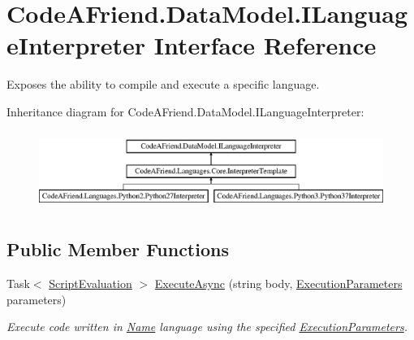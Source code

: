 \hypertarget{interface_code_a_friend_1_1_data_model_1_1_i_language_interpreter}{}\section{Code\+A\+Friend.\+Data\+Model.\+I\+Language\+Interpreter Interface Reference}
\label{interface_code_a_friend_1_1_data_model_1_1_i_language_interpreter}


Exposes the ability to compile and execute a specific language.  


Inheritance diagram for Code\+A\+Friend.\+Data\+Model.\+I\+Language\+Interpreter\+:\begin{figure}[H]
\begin{center}
\leavevmode
\includegraphics[height=2.560976cm]{interface_code_a_friend_1_1_data_model_1_1_i_language_interpreter}
\end{center}
\end{figure}
\subsection*{Public Member Functions}
\begin{DoxyCompactItemize}
\item 
Task$<$ \mbox{\hyperlink{class_code_a_friend_1_1_data_model_1_1_script_evaluation}{Script\+Evaluation}} $>$ \mbox{\hyperlink{interface_code_a_friend_1_1_data_model_1_1_i_language_interpreter_a3003897aaa13ee672b6157c584e46898}{Execute\+Async}} (string body, \mbox{\hyperlink{class_code_a_friend_1_1_data_model_1_1_execution_parameters}{Execution\+Parameters}} parameters)
\begin{DoxyCompactList}\small\item\em Execute code written in \mbox{\hyperlink{interface_code_a_friend_1_1_data_model_1_1_i_language_interpreter_ab8d4ee55278929fb59f3f015789aaa36}{Name}} language using the specified \mbox{\hyperlink{class_code_a_friend_1_1_data_model_1_1_execution_parameters}{Execution\+Parameters}}. \end{DoxyCompactList}\end{DoxyCompactItemize}
